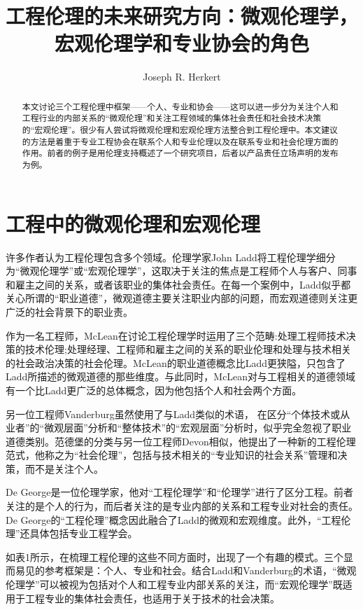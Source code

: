 \documentclass[lang=cn,11pt,a4paper]{elegantpaper}
\title{工程伦理的未来研究方向：微观伦理学，宏观伦理学和专业协会的角色}
\author{Joseph R. Herkert}
\institute{North Carolina State University, USA}
\date{}
\begin{document}
\maketitle

\begin{abstract}
本文讨论三个工程伦理中框架——个人、专业和协会——这可以进一步分为关注个人和工程行业的内部关系的“微观伦理”和关注工程领域的集体社会责任和社会技术决策的“宏观伦理”。很少有人尝试将微观伦理和宏观伦理方法整合到工程伦理中。本文建议的方法是着重于专业工程协会在联系个人和专业伦理以及在联系专业和社会伦理方面的作用。前者的例子是用伦理支持概述了一个研究项目，后者以产品责任立场声明的发布为例。
\end{abstract}



\section{工程中的微观伦理和宏观伦理}
许多作者认为工程伦理包含多个领域。伦理学家John Ladd将工程伦理学细分为“微观伦理学”或“宏观伦理学”，这取决于关注的焦点是工程师个人与客户、同事和雇主之间的关系，或者该职业的集体社会责任。在每一个案例中，Ladd似乎都关心所谓的“职业道德”，微观道德主要关注职业内部的问题，而宏观道德则关注更广泛的社会背景下的职业责。

作为一名工程师，McLean在讨论工程伦理学时运用了三个范畴:处理工程师技术决策的技术伦理;处理经理、工程师和雇主之间的关系的职业伦理和处理与技术相关的社会政治决策的社会伦理。McLean的职业道德概念比Ladd更狭隘，只包含了Ladd所描述的微观道德的那些维度。与此同时，McLean对与工程相关的道德领域有一个比Ladd更广泛的总体概念，因为他包括个人和社会两个方面。

另一位工程师Vanderburg虽然使用了与Ladd类似的术语，
在区分“个体技术或从业者”的“微观层面”分析和“整体技术”的“宏观层面”分析时，似乎完全忽视了职业道德类别。范德堡的分类与另一位工程师Devon相似，他提出了一种新的工程伦理范式，他称之为“社会伦理”，包括与技术相关的“专业知识的社会关系”管理和决策，而不是关注个人。

De George是一位伦理学家，他对“工程伦理学”和“伦理学”进行了区分工程。前者关注的是个人的行为，而后者关注的是专业内部的关系和工程专业对社会的责任。De George的“工程伦理”概念因此融合了Ladd的微观和宏观维度。此外，“工程伦理”还具体包括专业工程学会。

如表1所示，在梳理工程伦理的这些不同方面时，出现了一个有趣的模式。三个显而易见的参考框架是：个人、专业和社会。结合Ladd和Vanderburg的术语，“微观伦理学”可以被视为包括对个人和工程专业内部关系的关注，而“宏观伦理学”既适用于工程专业的集体社会责任，也适用于关于技术的社会决策。
\end{document}
